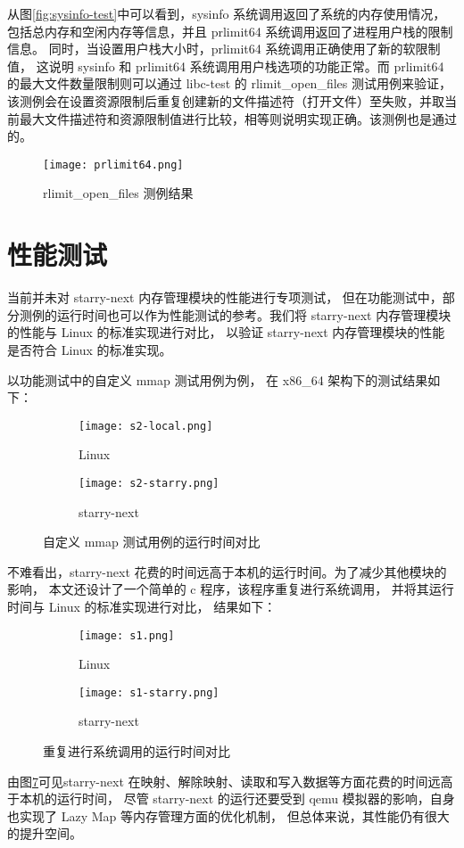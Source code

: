从图\ref{fig:sysinfo-test}中可以看到，sysinfo 系统调用返回了系统的内存使用情况，包括总内存和空闲内存等信息，并且 prlimit64 系统调用返回了进程用户栈的限制信息。
同时，当设置用户栈大小时，prlimit64 系统调用正确使用了新的软限制值，
这说明 sysinfo 和 prlimit64 系统调用用户栈选项的功能正常。而 prlimit64 的最大文件数量限制则可以通过 libc-test 的 rlimit\_open\_files 测试用例来验证，
该测例会在设置资源限制后重复创建新的文件描述符（打开文件）至失败，并取当前最大文件描述符和资源限制值进行比较，相等则说明实现正确。该测例也是通过的。

\begin{figure}
    \centering
    \texttt{[image: prlimit64.png]}
    \caption{rlimit\_open\_files 测例结果}
    \label{fig:prlimit64-test}
\end{figure}

\section{性能测试}

当前并未对 starry-next 内存管理模块的性能进行专项测试，
但在功能测试中，部分测例的运行时间也可以作为性能测试的参考。我们将 starry-next 内存管理模块的性能与 Linux 的标准实现进行对比，
以验证 starry-next 内存管理模块的性能是否符合 Linux 的标准实现。

以功能测试中的自定义 mmap 测试用例为例，
在 x86\_64 架构下的测试结果如下：
\begin{figure}[H]
    \centering  %
    \begin{subfigure}[t]{0.45\textwidth}
        \centering
        \texttt{[image: s2-local.png]}
        \caption{Linux}
        \label{fig:sub.1}
    \end{subfigure}
    \hfill %
    \begin{subfigure}[t]{0.45\textwidth}
        \centering
        \texttt{[image: s2-starry.png]}
        \caption{starry-next}
        \label{fig:sub.2}
    \end{subfigure}
    \caption{自定义 mmap 测试用例的运行时间对比}
    \label{Fig.main}
\end{figure}

不难看出，starry-next 花费的时间远高于本机的运行时间。为了减少其他模块的影响，
本文还设计了一个简单的 c 程序，该程序重复进行系统调用，
并将其运行时间与 Linux 的标准实现进行对比，
结果如下：

\begin{figure}[H]
    \centering  %
    \begin{subfigure}[t]{0.45\textwidth}
        \centering
        \texttt{[image: s1.png]}
        \caption{Linux}
        \label{fig:sub.3}
    \end{subfigure}
    \hfill %
    \begin{subfigure}[t]{0.45\textwidth}
        \centering
        \texttt{[image: s1-starry.png]}
        \caption{starry-next}
        \label{fig:sub.4}
    \end{subfigure}
    \caption{重复进行系统调用的运行时间对比}
    \label{Fig.main2}
\end{figure}

由图\ref{Fig.main2}可见starry-next 在映射、解除映射、读取和写入数据等方面花费的时间远高于本机的运行时间，
尽管 starry-next 的运行还要受到 qemu 模拟器的影响，自身也实现了 Lazy Map 等内存管理方面的优化机制，
但总体来说，其性能仍有很大的提升空间。